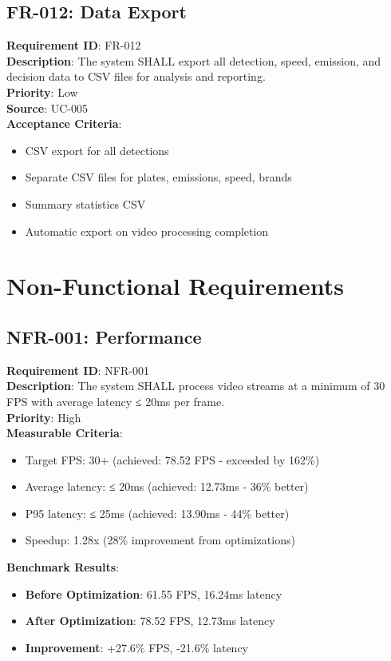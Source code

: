 \documentclass[12pt,a4paper]{article}
\begin{document}
\subsection{FR-012: Data Export}
\textbf{Requirement ID}: FR-012 \\
\textbf{Description}: The system SHALL export all detection, speed, emission, and decision data to CSV files for analysis and reporting. \\
\textbf{Priority}: Low \\
\textbf{Source}: UC-005 \\
\textbf{Acceptance Criteria}:
\begin{itemize}
    \item CSV export for all detections
    \item Separate CSV files for plates, emissions, speed, brands
    \item Summary statistics CSV
    \item Automatic export on video processing completion
\end{itemize}

\section{Non-Functional Requirements}

\subsection{NFR-001: Performance}
\textbf{Requirement ID}: NFR-001 \\
\textbf{Description}: The system SHALL process video streams at a minimum of 30 FPS with average latency ≤ 20ms per frame. \\
\textbf{Priority}: High \\
\textbf{Measurable Criteria}:
\begin{itemize}
    \item Target FPS: 30+ (achieved: 78.52 FPS - exceeded by 162\%)
    \item Average latency: ≤ 20ms (achieved: 12.73ms - 36\% better)
    \item P95 latency: ≤ 25ms (achieved: 13.90ms - 44\% better)
    \item Speedup: 1.28x (28\% improvement from optimizations)
\end{itemize}

\textbf{Benchmark Results}:
\begin{itemize}
    \item \textbf{Before Optimization}: 61.55 FPS, 16.24ms latency
    \item \textbf{After Optimization}: 78.52 FPS, 12.73ms latency
    \item \textbf{Improvement}: +27.6\% FPS, -21.6\% latency
\end{itemize}
\end{document}
